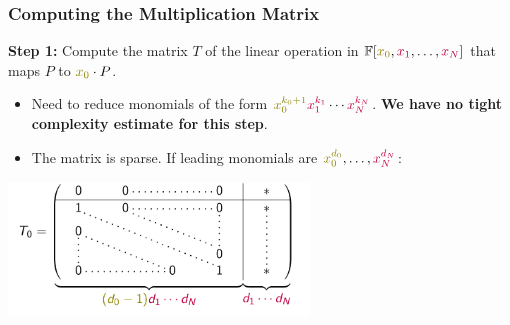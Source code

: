 \documentclass[aspectratio=169]{beamer}
\begin{document}
\begin{frame}
  \frametitle{Computing the Multiplication Matrix}

  \textbf{Step 1:} Compute the matrix $T$ of the linear operation in $\mathbb{F}[\textcolor{olive}{x_0},\textcolor{purple}{x_1},\ldots,\textcolor{purple}{x_N}]$ that maps $P$ to $\textcolor{olive}{x_0} \cdot P$.

  \begin{itemize}
  \item Need to reduce monomials of the form $\textcolor{olive}{x_0^{k_0+1}}\textcolor{purple}{x_1^{k_1}}\cdots \textcolor{purple}{x_N^{k_N}}$. \textbf{We have no tight complexity estimate for this step}.

    \pause
  \item The matrix is sparse. If leading monomials are $\textcolor{olive}{x_0^{d_0}},\ldots,\textcolor{purple}{x_N^{d_N}}$:
  \end{itemize}
  \begin{center}
    \includegraphics[width=8cm]{./figures/matrix}
  \end{center}

  
\end{frame}
\end{document}
